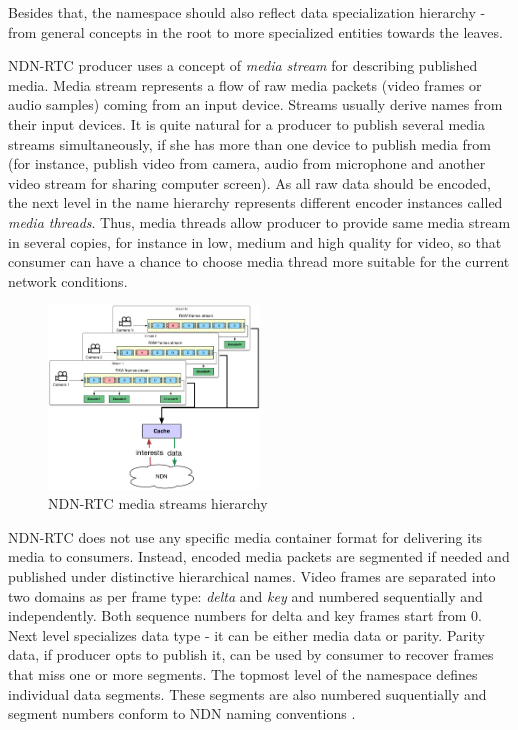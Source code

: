 \documentclass[10pt]{proc}
\begin{document}
Besides that, the namespace should also reflect data specialization hierarchy - from general concepts in the root to more specialized entities towards the leaves. 

NDN-RTC producer uses a concept of \textit{media stream} for describing published media. Media stream represents a flow of raw media packets (video frames or audio samples) coming from an input device. Streams usually derive names from their input devices. It is quite natural for a producer to publish several media streams simultaneously, if she has more than one device to publish media from (for instance, publish video from camera, audio from microphone and another video stream for sharing computer screen). As all raw data should be encoded, the next level in the name hierarchy represents different encoder instances called \textit{media threads}. Thus, media threads allow producer to provide same media stream in several copies, for instance in low, medium and high quality for video, so that consumer can have a chance to choose media thread more suitable for the current network conditions.

\begin{figure}[Ht!]
\centering
\includegraphics[width=0.5\textwidth]{streams-hierarchy}
\caption{NDN-RTC media streams hierarchy}
\label{fig:stream-hierarchy}
\end{figure}

NDN-RTC does not use any specific media container format for delivering its media to consumers. Instead, encoded media packets are segmented if needed and published under distinctive hierarchical names. Video frames are separated into two domains as per frame type: \textit{delta} and \textit{key} and numbered sequentially and independently. Both sequence numbers for delta and key frames start from 0. Next level specializes data type - it can be either media data or parity. Parity data, if producer opts to publish it, can be used by consumer to recover frames that miss one or more segments. The topmost level of the namespace defines individual data segments. These segments are also numbered suquentially and segment numbers conform to NDN naming conventions \cite{ndn_naming}.
\end{document}
